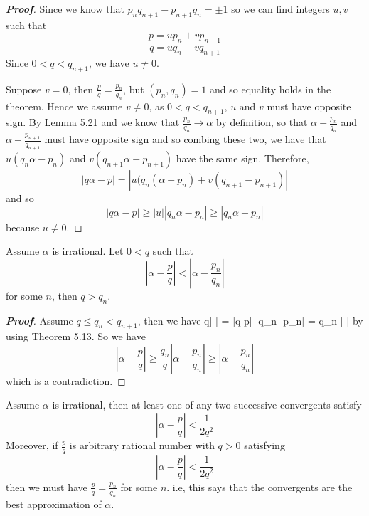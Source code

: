 \begin{proof}[\bf Proof] Since we know that $p_n q_{n+1}-p_{n+1}q_n = \pm 1$
so we can find integers $u,v$ such that
$$p=u p_n+vp_{n+1}$$
$$q=u q_n+vq_{n+1}$$
Since $0<q<q_{n+1}$, we have $u \neq 0$.

Suppose $v=0$, then $\frac{p}{q}=\frac{p_n}{q_n}$, but $(p_n,q_n)=1$ and so equality holds in the theorem. Hence we assume $v \neq 0$, as $0<q<q_{n+1}$, $u$ and $v$ must have opposite sign. By Lemma 5.21 and we know that $\frac{p_n}{q_n} \to \alpha$ by definition, so that
$\alpha -\frac{p_n}{q_n}$ and $\alpha-\frac{p_{n+1}}{q_{n+1}}$ must have opposite sign and so
combing these two, we have that $u(q_n \alpha-p_n)$ and $v(q_{n+1}\alpha-p_{n+1})$ have the same sign.
Therefore,
$$\left|q\alpha-p\right|=\left|u(q_n (\alpha-p_n)+v(q_{n+1}-p_{n+1})\right|$$
and so
$$\left|q\alpha-p\right| \ge |u|\left|q_n \alpha-p_n\right| \ge \left|q_n\alpha-p_n\right|$$
because $u \neq 0$.
\end{proof}
\begin{corollary} Assume $\alpha$ is irrational. Let $0<q$ such that
$$\left|\alpha-\frac{p}{q}\right|<\left|\alpha-\frac{p_n}{q_n}\right|$$
for some $n$, then $q>q_n$.
\end{corollary}
\begin{proof}[\bf Proof] Assume $q \le q_n < q_{n+1}$, then we have
\be
q\left|\alpha-\right| = \left|q\alpha-p\right| \ge \left|q_n \alpha -p_n\right| = q_n \left|\alpha-\right|
\ee
by using Theorem 5.13.
So we have
$$\left|\alpha-\frac{p}{q}\right| \ge \frac{q_n}{q}\left|\alpha-\frac{p_n}{q_n}\right| \ge \left|\alpha-\frac{p_n}{q_n}\right|$$
which is a contradiction.
\end{proof}
\begin{theorem} Assume $\alpha$ is irrational, then at least one of any two successive convergents satisfy
$$\left|\alpha-\frac{p}{q}\right|<\frac{1}{2q^2}$$
Moreover, if $\frac{p}{q}$ is arbitrary rational number with $q>0$ satisfying
$$\left|\alpha-\frac{p}{q}\right| <\frac{1}{2q^2}$$ then we must have
$\frac{p}{q}=\frac{p_n}{q_n}$ for some $n$. i.e, this says that the convergents are the best approximation of $\alpha$.
\end{theorem}
